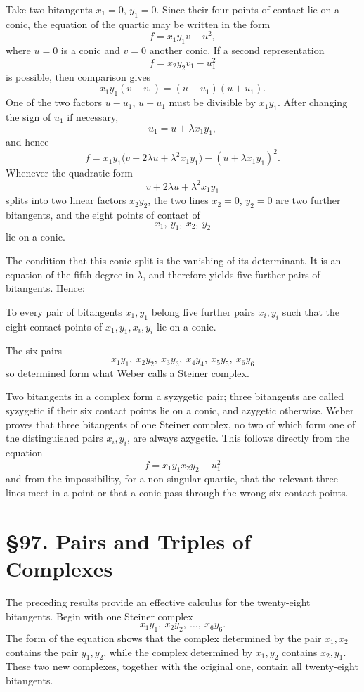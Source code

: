 \documentclass[12pt,a4paper]{article}
\newcommand{\webersection}[2]{\section*{\S #1. #2}\addcontentsline{toc}{section}{\S #1. #2}}
\begin{document}
Take two bitangents \(x_1=0\), \(y_1=0\).  Since their four points of contact lie on a conic, the equation of the quartic may be written in the form
\[
f=x_1y_1v-u^2,
\]
where \(u=0\) is a conic and \(v=0\) another conic.  If a second representation
\[
f=x_2y_2v_1-u_1^2
\]
is possible, then comparison gives
\[
x_1y_1(v-v_1)=(u-u_1)(u+u_1).
\]
One of the two factors \(u-u_1\), \(u+u_1\) must be divisible by \(x_1y_1\).  After changing the sign of \(u_1\) if necessary,
\[
u_1=u+\lambda x_1y_1,
\]
and hence
\[
f=x_1y_1\bigl(v+2\lambda u+\lambda^2x_1y_1\bigr)
  -(u+\lambda x_1y_1)^2.
\]
Whenever the quadratic form
\[
v+2\lambda u+\lambda^2x_1y_1
\]
splits into two linear factors \(x_2y_2\), the two lines \(x_2=0\), \(y_2=0\) are two further bitangents, and the eight points of contact of
\[
x_1,\ y_1,\ x_2,\ y_2
\]
lie on a conic.

The condition that this conic split is the vanishing of its determinant.  It is an equation of the fifth degree in \(\lambda\), and therefore yields five further pairs of bitangents.  Hence:

To every pair of bitangents \(x_1,y_1\) belong five further pairs \(x_i,y_i\) such that the eight contact points of \(x_1,y_1,x_i,y_i\) lie on a conic.

The six pairs
\[
x_1y_1,\ x_2y_2,\ x_3y_3,\ x_4y_4,\ x_5y_5,\ x_6y_6
\]
so determined form what Weber calls a Steiner complex.

Two bitangents in a complex form a syzygetic pair; three bitangents are called syzygetic if their six contact points lie on a conic, and azygetic otherwise.  Weber proves that three bitangents of one Steiner complex, no two of which form one of the distinguished pairs \(x_i,y_i\), are always azygetic.  This follows directly from the equation
\[
f=x_1y_1x_2y_2-u_1^2
\]
and from the impossibility, for a non-singular quartic, that the relevant three lines meet in a point or that a conic pass through the wrong six contact points.

\webersection{97}{Pairs and Triples of Complexes}

The preceding results provide an effective calculus for the twenty-eight bitangents.  Begin with one Steiner complex
\[
x_1y_1,\ x_2y_2,\ \dots,\ x_6y_6.
\]
The form of the equation shows that the complex determined by the pair \(x_1,x_2\) contains the pair \(y_1,y_2\), while the complex determined by \(x_1,y_2\) contains \(x_2,y_1\).  These two new complexes, together with the original one, contain all twenty-eight bitangents.
\end{document}

